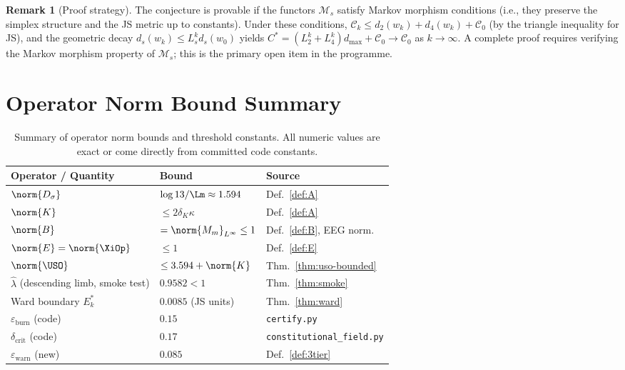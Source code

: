 \documentclass[12pt,a4paper]{article}
\theoremstyle{plain}
\theoremstyle{definition}
\newtheorem{remark}[theorem]{Remark}
\begin{document}
\begin{remark}[Proof strategy]
  The conjecture is provable if the functors $\mathcal{M}_s$ satisfy
  Markov morphism conditions (i.e., they preserve the simplex structure
  and the JS metric up to constants).  Under these conditions,
  $\mathcal{C}_k \le d_2(w_k) + d_4(w_k) + \mathcal{C}_0$
  (by the triangle inequality for JS), and the geometric decay
  $d_s(w_k) \le L_s^k d_s(w_0)$ yields
  $C^* = (L_2^k + L_4^k)d_{\max} + \mathcal{C}_0 \to \mathcal{C}_0$
  as $k\to\infty$.  A complete proof requires verifying the Markov
  morphism property of $\mathcal{M}_s$; this is the primary open item
  in the programme.
\end{remark}

\section{Operator Norm Bound Summary}
\label{sec:bounds}

\begin{table}[h!]
  \centering
  \renewcommand{\arraystretch}{1.35}
  \begin{tabular}{lll}
    \toprule
    \textbf{Operator / Quantity} & \textbf{Bound} & \textbf{Source} \\
    \midrule
    $\norm{D_\sigma}$    & $\log 13 / \Lm \approx 1.594$  & Def.~\ref{def:A} \\
    $\norm{K}$           & $\le 2\delta_K\kappa$            & Def.~\ref{def:A} \\
    $\norm{B}$           & $= \norm{M_m}_{L^\infty} \le 1$ & Def.~\ref{def:B}, EEG norm. \\
    $\norm{E} = \norm{\XiOp}$ & $\le 1$                      & Def.~\ref{def:E} \\
    $\norm{\USO}$        & $\le 3.594 + \norm{K}$          & Thm.~\ref{thm:uso-bounded} \\
    $\hat\lambda$ (descending limb, smoke test) & $0.9582 < 1$ & Thm.~\ref{thm:smoke} \\
    Ward boundary $E_k^*$ & $0.0085$ (JS units)            & Thm.~\ref{thm:ward} \\
    $\varepsilon_{\mathrm{burn}}$ (code) & $0.15$          & \texttt{certify.py} \\
    $\delta_{\mathrm{crit}}$ (code) & $0.17$              & \texttt{constitutional\_field.py} \\
    $\varepsilon_{\mathrm{warn}}$ (new) & $0.085$          & Def.~\ref{def:3tier} \\
    \bottomrule
  \end{tabular}
  \caption{Summary of operator norm bounds and threshold constants.
           All numeric values are exact or come directly from committed code constants.}
  \label{tab:bounds}
\end{table}
\end{document}
